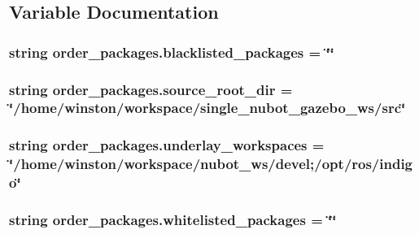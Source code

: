 \subsection{Variable Documentation}
\hypertarget{namespaceorder__packages_a29ea913f00c5a0e81d3c7688e7375507}{
\subsubsection[{blacklisted\-\_\-packages}]{\setlength{\rightskip}{0pt plus 5cm}string order\-\_\-packages.\-blacklisted\-\_\-packages = \char`\"{}\char`\"{}}}\label{namespaceorder__packages_a29ea913f00c5a0e81d3c7688e7375507}
\hypertarget{namespaceorder__packages_aff4fd297841de7fbddc2c0c33a6bab21}{
\subsubsection[{source\-\_\-root\-\_\-dir}]{\setlength{\rightskip}{0pt plus 5cm}string order\-\_\-packages.\-source\-\_\-root\-\_\-dir = \char`\"{}/home/winston/workspace/single\-\_\-nubot\-\_\-gazebo\-\_\-ws/src\char`\"{}}}\label{namespaceorder__packages_aff4fd297841de7fbddc2c0c33a6bab21}
\hypertarget{namespaceorder__packages_a11d102ff09fd2977b9075c4c722015d2}{
\subsubsection[{underlay\-\_\-workspaces}]{\setlength{\rightskip}{0pt plus 5cm}string order\-\_\-packages.\-underlay\-\_\-workspaces = \char`\"{}/home/winston/workspace/nubot\-\_\-ws/devel;/opt/ros/indigo\char`\"{}}}\label{namespaceorder__packages_a11d102ff09fd2977b9075c4c722015d2}
\hypertarget{namespaceorder__packages_a84450a73e77dbf3689293b97dcb697a4}{
\subsubsection[{whitelisted\-\_\-packages}]{\setlength{\rightskip}{0pt plus 5cm}string order\-\_\-packages.\-whitelisted\-\_\-packages = \char`\"{}\char`\"{}}}\label{namespaceorder__packages_a84450a73e77dbf3689293b97dcb697a4}
